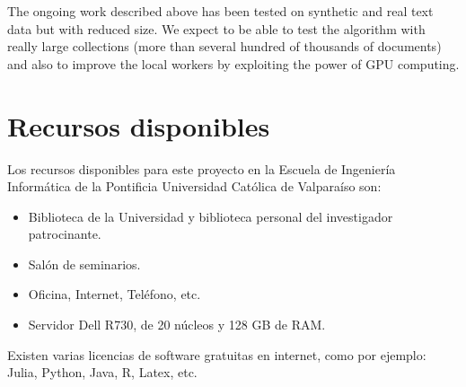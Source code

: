 \documentclass[10pt]{article}
\begin{document}

The ongoing work described above has been tested on synthetic and real text data but with reduced size. 
We expect to be able to test the algorithm with really large collections (more than several hundred of thousands of documents) and also to improve the local workers by exploiting the power of GPU computing. 


\section{Recursos disponibles}
Los recursos disponibles para este proyecto en la Escuela de Ingeniería Informática de la Pontificia Universidad Católica de Valparaíso son:

\begin{itemize}
\item Biblioteca de la Universidad y biblioteca personal del investigador patrocinante.
\item Salón de seminarios.
\item Oficina, Internet, Teléfono, etc.
\item Servidor Dell R730, de 20 núcleos y 128 GB de RAM.
\end{itemize}

Existen varias licencias de software gratuitas en internet, como por ejemplo: Julia, Python, Java, R, Latex, etc. 
\end{document}
